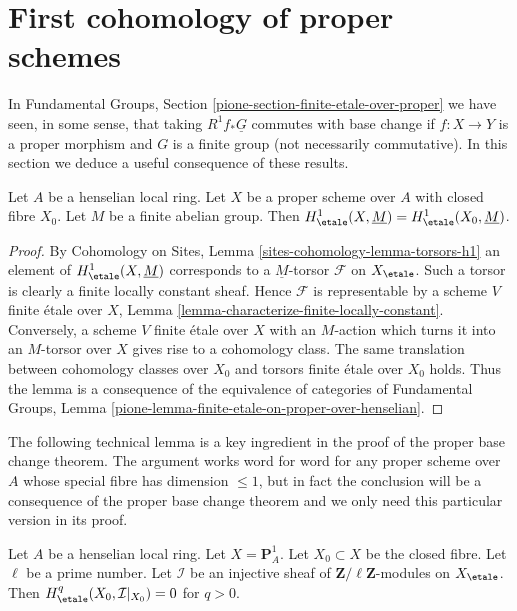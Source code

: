 \section{First cohomology of proper schemes}
\label{section-finite-etale-over-proper}

\noindent
In Fundamental Groups, Section \ref{pione-section-finite-etale-over-proper}
we have seen, in some sense, that taking
$R^1f_*\underline{G}$ commutes with base change if $f : X \to Y$
is a proper morphism and $G$ is a finite group (not necessarily
commutative). In this section
we deduce a useful consequence of these results.

\begin{lemma}
\label{lemma-proper-over-henselian-and-h1}
Let $A$ be a henselian local ring. Let $X$ be a proper scheme over $A$
with closed fibre $X_0$. Let $M$ be a finite abelian group.
Then $H^1_\etale(X, \underline{M}) = H^1_\etale(X_0, \underline{M})$.
\end{lemma}

\begin{proof}
By Cohomology on Sites, Lemma \ref{sites-cohomology-lemma-torsors-h1}
an element of $H^1_\etale(X, \underline{M})$ corresponds to a
$\underline{M}$-torsor $\mathcal{F}$ on $X_\etale$.
Such a torsor is clearly a finite locally constant sheaf.
Hence $\mathcal{F}$ is representable by a scheme $V$ finite
\'etale over $X$, Lemma \ref{lemma-characterize-finite-locally-constant}.
Conversely, a scheme $V$ finite \'etale over $X$ with an $M$-action
which turns it into an $M$-torsor over $X$ gives rise to a cohomology
class. The same translation between cohomology classes over $X_0$ and
torsors finite \'etale over $X_0$ holds. Thus the lemma
is a consequence of the equivalence of categories of
Fundamental Groups, Lemma
\ref{pione-lemma-finite-etale-on-proper-over-henselian}.
\end{proof}

\noindent
The following technical lemma is a key ingredient in the proof of
the proper base change theorem. The argument works word for word
for any proper scheme over $A$ whose special fibre has dimension
$\leq 1$, but in fact the conclusion will be a consequence of the
proper base change theorem and we only need this particular version
in its proof.

\begin{lemma}
\label{lemma-efface-cohomology-on-fibre-by-finite-cover}
Let $A$ be a henselian local ring. Let $X = \mathbf{P}^1_A$.
Let $X_0 \subset X$ be the closed fibre. Let $\ell$ be a prime
number. Let $\mathcal{I}$ be an injective sheaf of
$\mathbf{Z}/\ell\mathbf{Z}$-modules on $X_\etale$. Then
$H^q_\etale(X_0, \mathcal{I}|_{X_0}) = 0$ for $q > 0$.
\end{lemma}

